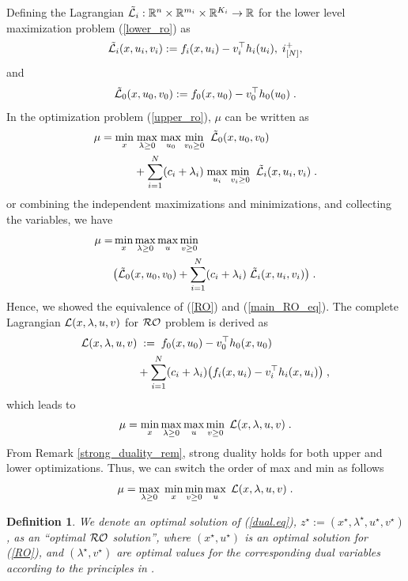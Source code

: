 \documentclass[journal,twoside,web]{ieeecolor}
\newtheorem{definition}{Definition}
\begin{document}
Defining the Lagrangian $\tilde {\cal L}_i:\mathbb{R}^n \times \mathbb{R}^{m_i} \times \mathbb{R}^{K_i} \rightarrow \mathbb{R}$ for the lower level maximization problem (\ref{lower_ro}) as
\begin{align} \label{lower_lag}
\tilde {\cal L}_i(x,u_i,v_i):=f_i(x,u_i)-v_i^\top h_{i}(u_i),\;i^+_{[N]},
\end{align}
and
\begin{align} \label{upper_lag}
\tilde {\cal L}_0(x,u_0,v_0):=f_0(x,u_0)-v_0^\top h_{0}(u_0)\;.
\end{align}
In the optimization problem (\ref{upper_ro}), $\mu$ can be written as
\begin{align} \label{main_RO_eq}
\mu=\underset{x}{\min}&\;\underset{\lambda\geq 0}{\max}\;\underset{u_0}{\max}\;\underset{v_0\geq 0}{\min}\;\; \tilde{\cal L}_0(x,u_0,v_0)\\
&+\sum_{i=1}^N (c_i+\lambda_i)\; \underset{u_i}{\max}\;\underset{v_{i}\geq 0}{\min}\;\;\tilde {\cal L}_i(x,u_i,v_i)\;\nonumber.
\end{align}
or combining the independent maximizations and minimizations, and collecting the variables, we have
\begin{align}\label{main_RO2_eq}
\mu=&\min_{x}\max_{\lambda\geq 0}\max_{u}\min_{v\geq 0} \\
&\big(\tilde{\cal L}_0(x,u_0,v_0)+\sum_{i=1}^N (c_i+\lambda_i) \; \tilde {\cal L}_i(x,u_i,v_i)\big)\;.\nonumber
\end{align}
Hence, we showed the equivalence of (\ref{RO}) and (\ref{main_RO_eq}).
The complete Lagrangian ${\cal L}(x,\lambda,u,v)$ for ${\cal RO}$ problem is derived as
\begin{align}
{\cal L}(x,\lambda,u,v)&\;:=\;f_0(x,u_0)-v_0^\top h_0(x,u_0)\nonumber\\
&+\sum_{i=1}^N (c_i+\lambda_i)\big(f_i(x,u_i)-v_i^\top h_i(x,u_i)\big)\;,
\label{lag}
\end{align}
which leads to
\begin{align*}
\mu=\min_{x}\max_{\lambda\geq 0}\max_{u}\min_{v\geq 0}\;{\cal L}(x,\lambda,u,v)\;.
\end{align*}
From Remark \ref{strong_duality_rem}, strong duality holds for both upper and lower optimizations. Thus, we can switch the order of max and min as follows
\begin{equation}\label{dual.eq}
\mu=\max_{\lambda\geq 0}\;\min_{x}\min_{v\geq 0} \max_{u}\;{\cal L}(x,\lambda,u,v)\;.
\end{equation}

\begin{definition} \label{optimal_ro}
We denote an optimal solution of (\ref{dual.eq}), $z^\star:=(x^\star,\lambda^\star,u^\star,v^\star)$, as an {\color{blue}``optimal ${\cal RO}$ solution''}, where $(x^\star, u^\star)$ is an optimal solution for (\ref{RO}), and $(\lambda^\star, v^\star)$ are optimal values for the corresponding dual variables according to the principles in \cite[Section~5.9.1]{boyd2004}.
\end{definition}
\end{document}
